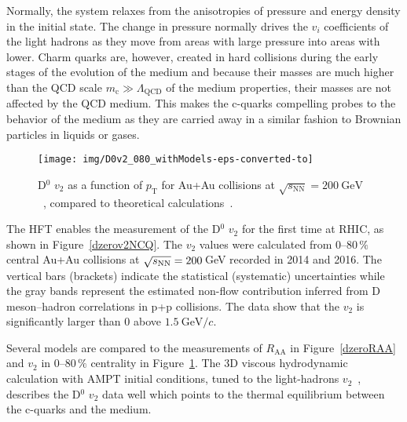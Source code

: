 Normally, the system relaxes from the anisotropies of pressure and energy density in the initial state. The change in pressure normally drives the $v_i$ coefficients of the light hadrons as they move from areas with large pressure into areas with lower. Charm quarks are, however, created in hard collisions during the early stages of the evolution of the medium and because their masses are much higher than the QCD scale $m_\mathrm{c} \gg \Lambda_\text{QCD}$ of the medium properties, their masses are not affected by the QCD medium. This makes the c-quarks compelling probes to the behavior of the medium as they are carried away in a similar fashion to Brownian particles in liquids or gases. 

\begin{figure}[!htb]
\begin{center}
 \texttt{[image: img/D0v2\_080\_withModels-eps-converted-to]}\\
\end{center}
\caption[D$^0$ $v_2$ as a function of $p_\mathrm{T}$.]{\label{dzerov2}D$^0$ $v_2$ as a function of $p_\mathrm{T}$ for Au+Au collisions
at $\sqrt{s_\mathrm{NN}} = \SI{200}{\giga\electronvolt}$~\cite{D0v2paper}, compared to theoretical calculations~\cite{PHSD2014,LBT,LBTprivate,TAMU,PHSD2015,SUBATECHvn,SUBATECHquenching,Duke,Duke2015,Hydro2012,Hydro2015}.}
\end{figure}


The HFT enables the measurement of the D$^0$ $v_2$ for the first 
time at RHIC, as shown in Figure~\ref{dzerov2NCQ}\@. The $v_2$ values were calculated from 0--80$\,\%$ central Au+Au collisions at $\sqrt{s_\text{NN}} = 200\,$GeV recorded in 2014 and 2016. The vertical bars (brackets) indicate 
the statistical (systematic)
uncertainties while the gray bands represent the estimated non-flow contribution inferred
from D meson--hadron correlations in p+p collisions. The data show that the $v_2$
is significantly larger than 0 above $\SI{1.5}{\giga\electronvolt}/c$\@.

Several models \cite{Hydro2012,Hydro2015,PHSD2014,LBT,LBTprivate,TAMU,PHSD2015,SUBATECHvn,SUBATECHquenching,Duke,Duke2015} are compared to the
measurements of $R_\mathrm{AA}$ in Figure~\ref{dzeroRAA} and $v_2$ in 0--80$\,\%$ centrality 
in Figure~\ref{dzerov2}\@. The 3D viscous hydrodynamic calculation with AMPT 
initial conditions, tuned to the light-hadrons $v_2$~\cite{Hydro2012,Hydro2015}, describes the D$^0$ $v_2$ data well 
which points to the thermal equilibrium between the c-quarks and the medium.

